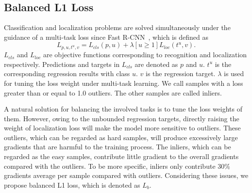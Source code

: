 \documentclass[10pt,twocolumn,letterpaper]{article}
\begin{document}
\subsection{Balanced L1 Loss}
Classification and localization problems are solved simultaneously under the guidance of a multi-task loss since Fast R-CNN~\cite{fastrcnn}, which is defined as
\begin{equation}
	\label{equ:multi-task}
	L_{p, u, t^u, v} = L_{cls}(p, u) + \lambda[u \ge 1]L_{loc}(t^u, v).
\end{equation}
$L_{cls}$ and $L_{loc}$ are objective functions corresponding to recognition and localization respectively.
Predictions and targets in $L_{cls}$ are denoted as $p$ and $u$.
$t^u$ is the corresponding regression results with class $u$.
$v$ is the regression target.
$\lambda$ is used for tuning the loss weight under multi-task learning.
We call samples with a loss greater than or equal to 1.0 outliers.
The other samples are called inliers.

A natural solution for balancing the involved tasks is to tune the loss weights of them.
However, owing to the unbounded regression targets,
directly raising the weight of localization loss will make the model more sensitive to outliers.
These outliers, which can be regarded as hard samples, will produce excessively large gradients that are harmful to the training process.
The inliers, which can be regarded as the easy samples, contribute little gradient to the overall gradients compared with the outliers.
To be more specific, inliers only contribute 30\% gradients average per sample compared with outliers.
Considering these issues, we propose balanced L1 loss, which is denoted as $L_{b}$.
\end{document}
